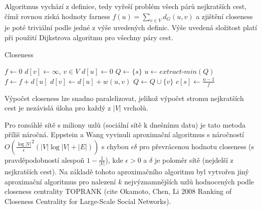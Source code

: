\documentclass[12pt,titlepage]{report}
\begin{document}
Algoritmus vychází z definice, tedy vyřeší problém všech párů nejkratších cest,
čímž rovnou získá hodnoty farness $f(u) = \sum_{v \in V} d_G(u, v)$ a zjištění
closeness je poté triviální podle jedné z výše uvedených definic.  Výše uvedená
složitost platí při použití Dijkstrova algoritmu pro všechny páry cest.

\begin{center}
\begin{minipage}{\textwidth}
\begin{algorithm}[H]
	\caption{Closeness}
		\label{alg:closeness}

	\begin{algorithmic}[1]
	\Statex
		\State $f \gets 0$
		\State $d[v] \gets \infty$, $v \in V$
		\State $d[u] \gets 0$
		\State $Q \gets \{s\}$
			\State $u \gets extract\mbox{-}min(Q)$
			\State $f \gets f + d[u]$
					\State $d[v] \gets d[u] + w(u, v)$
					\State $Q \gets Q \cup \{v\}$
				\EndIf
			\EndFor
		\EndWhile
		\State $c[s] \gets \frac{n - 1}{f}$
	\EndFor
	\end{algorithmic}
\end{algorithm}
\end{minipage}
\end{center}
\mbox{}

Výpočet closeness lze snadno paralelizovat, jelikož výpočet stromu nejkratších
cest je nezávislá úloha pro každý z $|V|$ vrcholů.

Pro rozsáhlé sítě s miliony uzlů (sociální sítě k dnešnímu datu) je tato metoda
příliš náročná. Eppstein a Wang vyvinuli aproximační algoritmus s náročností
$O(\frac{\log|V|}{\epsilon}^2 (|V| \log |V| + |E|))$ s chybou $\epsilon \delta$
pro převrácenou hodnotu closeness (s pravděpodobností alespoň $1 -
\frac{1}{|V|}$), kde $\epsilon > 0$ a $\delta$ je poloměr sítě (nejdelší z
nejkratších cest). Na základě tohoto aproximačního algoritmu byl vytvořen jiný
aproximační algoritmus pro nalezení $k$ nejvýznamnějších uzlů hodnocených podle
closeness centrality TOPRANK (cite Okamoto, Chen, Li 2008 Ranking of Closeness
Centrality for Large-Scale Social Networks).
\end{document}
